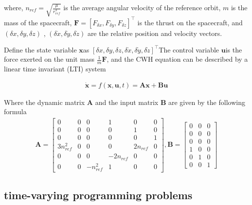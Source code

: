 \documentclass[times,authoryear]{elsarticle}
\begin{document}
where, $n_{ref} = \sqrt{\frac{\mu}{r^3_{ref}}}$ is the average angular velocity of the reference orbit, $m$ is the mass of the spacecraft, $\boldsymbol{F} = [{F}_{\delta x}, {F}_{\delta y}, {F}_{\delta z}]^\top$ is the thrust on the spacecraft, and $(\delta x, \delta y, \delta z)$ , $(\delta \dot{x}, \delta \dot{y}, \delta \dot{z})$ are the relative position and velocity vectors.

Define the state variable $\boldsymbol{x}$as $[\delta x,\delta y,\delta z,\delta \dot{x}, \delta \dot{y}, \delta \dot{z}]^{\top}$The control variable $\boldsymbol{u}$is the force exerted on the unit mass $\frac{1}{m} \boldsymbol{F}$, and the CWH equation can be described by a linear time invariant (LTI) system

\begin{equation}
	\begin{align}
		\boldsymbol{\dot{x}} = f(\boldsymbol{x},\boldsymbol{u},t) = \boldsymbol{A}\boldsymbol{x}+\boldsymbol{B}\boldsymbol{u}
	\end{align}
\end{equation}

Where the dynamic matrix $\boldsymbol{A}$ and the input matrix $\boldsymbol{B}$ are given by the following formula
\begin{equation}
  \begin{align}
      \boldsymbol{A} = 
      \begin{bmatrix}
       0 &0 &0 &1 &0 &0 \\
       0 &0 &0 &0 &1 &0 \\
       0 &0 &0 &0 &0 &1 \\
       3n_{ref}^2 &0 &0 &0 &2n_{ref} &0 \\
       0 &0 &0 &-2n_{ref} &0 &0 \\
       0 &0 &-n_{ref}^2 &1 &0 &0
      \end{bmatrix}
      ,\boldsymbol{B} = 
      \begin{bmatrix}
      0 &0 &0 \\
      0 &0 &0 \\
      0 &0 &0 \\
      1 &0 &0 \\
      0 &1 &0 \\
      0 &0 &1
      \end{bmatrix}
  \end{align}
\end{equation}

\subsection{time-varying programming problems}
\end{document}
